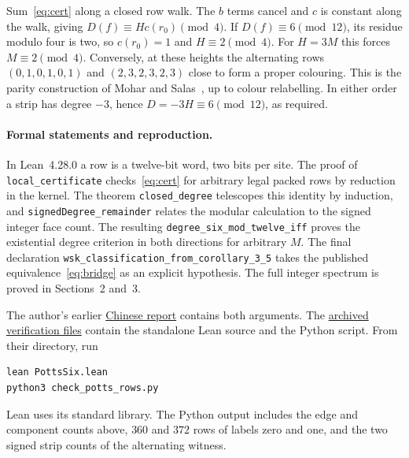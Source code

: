 \documentclass[11pt,a4paper]{article}
\begin{document}
Sum~\eqref{eq:cert} along a closed row walk. The $b$ terms cancel and $c$ is constant along the walk, giving $D(f)\equiv Hc(r_0)\pmod4$. If $D(f)\equiv6\pmod{12}$, its residue modulo four is two, so $c(r_0)=1$ and $H\equiv2\pmod4$. For $H=3M$ this forces $M\equiv2\pmod4$. Conversely, at these heights the alternating rows $(0,1,0,1,0,1)$ and $(2,3,2,3,2,3)$ close to form a proper colouring. This is the parity construction of Mohar and Salas~\cite[Eq.~(4.1)]{ms}, up to colour relabelling. In either order a strip has degree $-3$, hence $D=-3H\equiv6\pmod{12}$, as required.

\paragraph{Formal statements and reproduction.}
In Lean~4.28.0 a row is a twelve-bit word, two bits per site. The proof of \texttt{local\_certificate} checks~\eqref{eq:cert} for arbitrary legal packed rows by reduction in the kernel. The theorem \texttt{closed\_degree} telescopes this identity by induction, and \texttt{signedDegree\_remainder} relates the modular calculation to the signed integer face count. The resulting \texttt{degree\_six\_mod\_twelve\_iff} proves the existential degree criterion in both directions for arbitrary $M$. The final declaration \texttt{wsk\_classification\_from\_corollary\_3\_5} takes the published equivalence~\eqref{eq:bridge} as an explicit hypothesis. The full integer spectrum is proved in Sections~2 and~3.

The author's earlier \href{https://github.com/rongyulin/physics-open-problems-AI/blob/6f8201f6ad061264fc7b93f7d776d961664df06c/problems/potts-wsk-ergodicity/PottsSix_report_zh.md}{Chinese report} contains both arguments. The \href{https://github.com/rongyulin/physics-open-problems-AI/tree/6f8201f6ad061264fc7b93f7d776d961664df06c/problems/potts-wsk-ergodicity/Lean}{archived verification files} contain the standalone Lean source and the Python script. From their directory, run
\begin{verbatim}
lean PottsSix.lean
python3 check_potts_rows.py
\end{verbatim}
Lean uses its standard library. The Python output includes the edge and component counts above, $360$ and $372$ rows of labels zero and one, and the two signed strip counts of the alternating witness.
\end{document}
